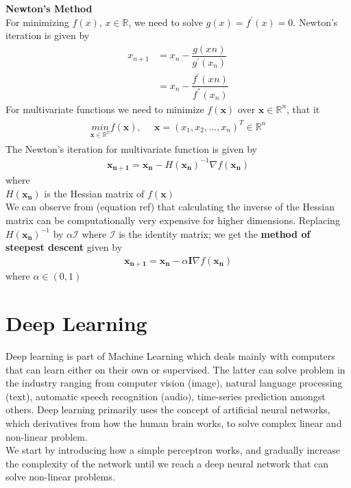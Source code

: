 \vspace{5mm}
\noindent\textbf{Newton's Method}\\
For minimizing $f(x)$, $x \in \mathbb{R}$, we need to solve $g(x) = f^{'}(x)=0$. Newton's iteration is given by 
\begin{align}
  x_{n+1} &= x_{n} - \dfrac{g(x_{}n)}{g^{'}(x_n)} \\
          &= x_{n} - \dfrac{f^{'}(x_{}n)}{f^{''}(x_n)}
\end{align}
For multivariate functions we need to minimize $f(\mathbf{x})$ over $\mathbf{x} \in \mathbb{R}^n$, that it
\begin{align}
  \begin{matrix}
    \underset{\mathbf{x}\in\mathbb{R}^n}{min} f(\mathbf{x}), & \,\,\, \mathbf{x} =(x_1,x_2,\dots,x_n)^T \in \mathbb{R}^n
  \end{matrix} 
\end{align}
The Newton's iteration for multivariate function is given by
\begin{align}
  \mathbf{x_{n+1}} = \mathbf{x_{n}} - H(\mathbf{x_n})^{-1}\nabla f(\mathbf{x_n})
\end{align}
where\\
\indent $H(\mathbf{x_n})$ is the Hessian matrix of $f(\mathbf{x})$\\
\noindent We can observe from (equation ref) that calculating the inverse of the Hessian matrix can be computationally very expensive for higher dimensions. Replacing $H(\mathbf{x_n})^{-1}$ by $\alpha \mathcal{I}$ where $\mathcal{I}$ is the identity matrix; we get the \textbf{method of steepest descent} given by
\begin{align}
  \mathbf{x_{n+1}} = \mathbf{x_{n}} - \alpha \textbf{I} \nabla f(\mathbf{x_n})
\end{align}
where $\alpha \in (0,1)$ 
\section{Deep Learning}
Deep learning is part of Machine Learning which deals mainly with computers that can learn either on their own or supervised. The latter can solve problem in the industry ranging from computer vision (image), natural language processing (text), automatic speech recognition (audio), time-series prediction amongst others. Deep learning primarily uses the concept of artificial neural networks, which derivatives from how the human brain works, to solve complex linear and non-linear problem.\\
\indent We start by introducing how a simple perceptron works, and gradually increase the complexity of the network until we reach a deep neural network that can solve non-linear problems.
